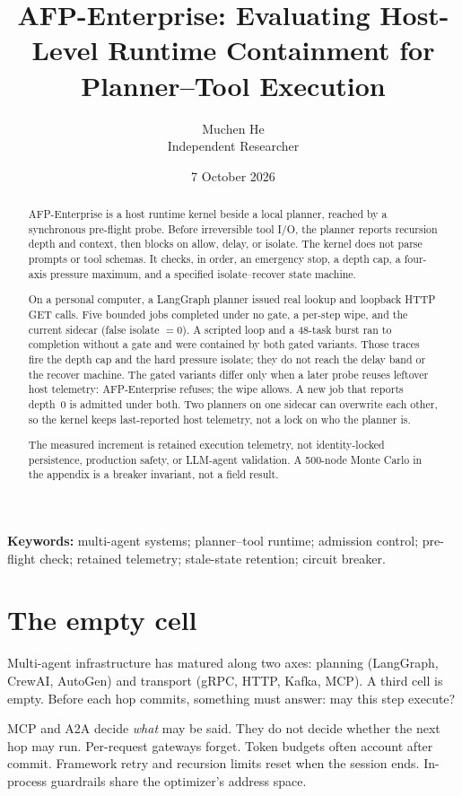 \documentclass[11pt,a4paper]{article}
\title{\textbf{AFP-Enterprise: Evaluating Host-Level Runtime Containment for Planner--Tool Execution}}
\author{Muchen He\\Independent Researcher}
\date{7 October 2026}
\begin{document}
\maketitle

\begin{abstract}
AFP-Enterprise is a host runtime kernel beside a local planner, reached by a synchronous pre-flight probe.
Before irreversible tool I/O, the planner reports recursion depth and context, then blocks on allow, delay, or isolate.
The kernel does not parse prompts or tool schemas.
It checks, in order, an emergency stop, a depth cap, a four-axis pressure maximum, and a specified isolate--recover state machine.

On a personal computer, a LangGraph planner issued real lookup and loopback HTTP GET calls.
Five bounded jobs completed under no gate, a per-step wipe, and the current sidecar (false isolate $=0$).
A scripted loop and a 48-task burst ran to completion without a gate and were contained by both gated variants.
Those traces fire the depth cap and the hard pressure isolate; they do not reach the delay band or the recover machine.
The gated variants differ only when a later probe reuses leftover host telemetry: AFP-Enterprise refuses; the wipe allows.
A new job that reports depth~$0$ is admitted under both.
Two planners on one sidecar can overwrite each other, so the kernel keeps last-reported host telemetry, not a lock on who the planner is.

The measured increment is retained execution telemetry, not identity-locked persistence, production safety, or LLM-agent validation.
A 500-node Monte Carlo in the appendix is a breaker invariant, not a field result.
\end{abstract}

\noindent\textbf{Keywords:} multi-agent systems; planner--tool runtime; admission control; pre-flight check; retained telemetry; stale-state retention; circuit breaker.

\section{The empty cell}

Multi-agent infrastructure has matured along two axes: planning (LangGraph, CrewAI, AutoGen) and transport (gRPC, HTTP, Kafka, MCP).
A third cell is empty.
Before each hop commits, something must answer: may this step execute?

MCP and A2A decide \emph{what} may be said.
They do not decide whether the next hop may run.
Per-request gateways forget.
Token budgets often account after commit.
Framework retry and recursion limits reset when the session ends.
In-process guardrails share the optimizer's address space.
\end{document}
